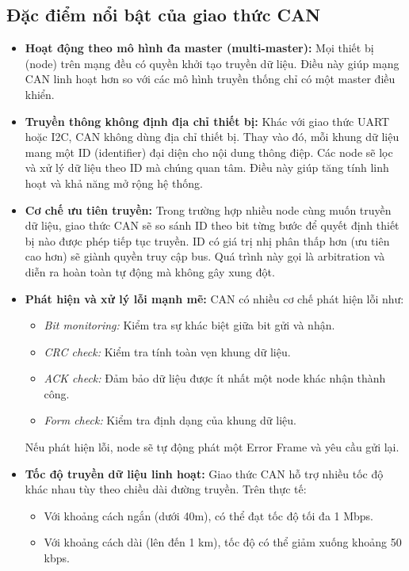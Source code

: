 \subsection{Đặc điểm nổi bật của giao thức CAN}
\begin{itemize}[leftmargin=*]
    \item \textbf{Hoạt động theo mô hình đa master (multi-master):} Mọi thiết bị (node) trên mạng đều có quyền khởi tạo truyền dữ liệu. Điều này giúp mạng CAN linh hoạt hơn so với các mô hình truyền thống chỉ có một master điều khiển.
    \item \textbf{Truyền thông không định địa chỉ thiết bị:} Khác với giao thức UART hoặc I2C, CAN không dùng địa chỉ thiết bị. Thay vào đó, mỗi khung dữ liệu mang một ID (identifier) đại diện cho nội dung thông điệp. Các node sẽ lọc và xử lý dữ liệu theo ID mà chúng quan tâm. Điều này giúp tăng tính linh hoạt và khả năng mở rộng hệ thống.
    \item \textbf{Cơ chế ưu tiên truyền:} Trong trường hợp nhiều node cùng muốn truyền dữ liệu, giao thức CAN sẽ so sánh ID theo bit từng bước để quyết định thiết bị nào được phép tiếp tục truyền. ID có giá trị nhị phân thấp hơn (ưu tiên cao hơn) sẽ giành quyền truy cập bus. Quá trình này gọi là arbitration và diễn ra hoàn toàn tự động mà không gây xung đột.
    \item \textbf{Phát hiện và xử lý lỗi mạnh mẽ:} CAN có nhiều cơ chế phát hiện lỗi như:
    \begin{itemize}
        \item \textit{Bit monitoring:} Kiểm tra sự khác biệt giữa bit gửi và nhận.
        \item \textit{CRC check:} Kiểm tra tính toàn vẹn khung dữ liệu.
        \item \textit{ACK check:} Đảm bảo dữ liệu được ít nhất một node khác nhận thành công.
        \item \textit{Form check:} Kiểm tra định dạng của khung dữ liệu.
    \end{itemize}
    Nếu phát hiện lỗi, node sẽ tự động phát một Error Frame và yêu cầu gửi lại.
    \item \textbf{Tốc độ truyền dữ liệu linh hoạt:} Giao thức CAN hỗ trợ nhiều tốc độ khác nhau tùy theo chiều dài đường truyền. Trên thực tế:
    \begin{itemize}
        \item Với khoảng cách ngắn (dưới 40m), có thể đạt tốc độ tối đa 1 Mbps.
        \item Với khoảng cách dài (lên đến 1 km), tốc độ có thể giảm xuống khoảng 50 kbps.

\end{itemize}
\end{itemize}

